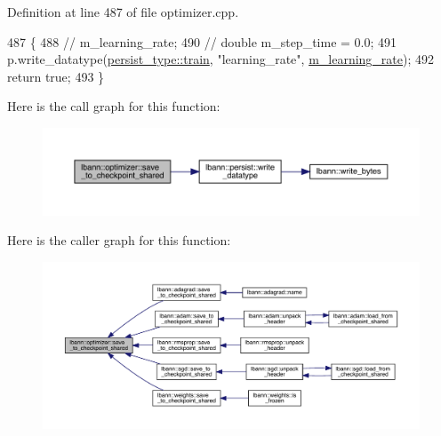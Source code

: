 Definition at line 487 of file optimizer.\+cpp.


\begin{DoxyCode}
487                                                                       \{
488   \textcolor{comment}{//  m\_learning\_rate;}
490 \textcolor{comment}{}  \textcolor{comment}{//  double m\_step\_time = 0.0;}
491   p.write\_datatype(\hyperlink{namespacelbann_adee41f31f15f3906cbdcce4a1417eb56a61b3a8faa9c1091806675c230a9abe64}{persist\_type::train}, \textcolor{stringliteral}{"learning\_rate"}, 
      \hyperlink{classlbann_1_1optimizer_ad393dcdcb82b44510c586ed5ec46d4dd}{m\_learning\_rate});
492   \textcolor{keywordflow}{return} \textcolor{keyword}{true};
493 \}
\end{DoxyCode}
Here is the call graph for this function\+:\nopagebreak
\begin{figure}[H]
\begin{center}
\leavevmode
\includegraphics[width=350pt]{classlbann_1_1optimizer_afed10c6d8c5bd922f95075abeff711ce_cgraph}
\end{center}
\end{figure}
Here is the caller graph for this function\+:\nopagebreak
\begin{figure}[H]
\begin{center}
\leavevmode
\includegraphics[width=350pt]{classlbann_1_1optimizer_afed10c6d8c5bd922f95075abeff711ce_icgraph}
\end{center}
\end{figure}
\mbox{\label{classlbann_1_1optimizer_a147cac09beaa17df4e0fc1fc1be3abce}} 
